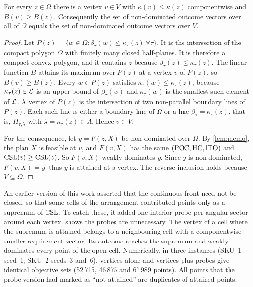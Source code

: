 \begin{theorem}\label{thm:vertex}
  For every $z\in\Omega$ there is a vertex $v\in V$ with $\kappa(v)\le\kappa(z)$
  componentwise and $B(v)\ge B(z)$. Consequently the set of non-dominated outcome vectors
  over all of $\Omega$ equals the set of non-dominated outcome vectors over $V$.
\end{theorem}

\begin{proof}
  Let $P(z)=\{w\in\Omega : \beta_\tau(w)\le\kappa_\tau(z)\ \forall\tau\}$. It is the
  intersection of the compact polygon $\Omega$ with finitely many closed half-planes. It
  is therefore a compact convex polygon, and it contains $z$ because
  $\beta_\tau(z)\le\kappa_\tau(z)$. The linear function $B$ attains its maximum over
  $P(z)$ at a vertex $v$ of $P(z)$, so $B(v)\ge B(z)$. Every $w\in P(z)$ satisfies
  $\kappa_\tau(w)\le\kappa_\tau(z)$, because $\kappa_\tau(z)\in\mathcal{L}$ is an upper bound of
  $\beta_\tau(w)$ and $\kappa_\tau(w)$ is the smallest such element of $\mathcal{L}$. A vertex of
  $P(z)$ is the intersection of two non-parallel boundary lines of $P(z)$. Each such line
  is either a boundary line of $\Omega$ or a line $\beta_\tau=\kappa_\tau(z)$, that is,
  $H_{\tau,\lambda}$ with $\lambda=\kappa_\tau(z)\in\Lambda$. Hence $v\in V$.

  For the consequence, let $y=F(z,X)$ be non-dominated over $\Omega$. By
  \cref{lem:memo}, the plan $X$ is feasible at $v$, and $F(v,X)$ has the same
  $(\mathrm{POC},\mathrm{HC},\mathrm{ITO})$ and $\mathrm{CSL}(v)\ge\mathrm{CSL}(z)$. So $F(v,X)$ weakly dominates $y$. Since $y$
  is non-dominated, $F(v,X)=y$; thus $y$ is attained at a vertex. The reverse inclusion
  holds because $V\subseteq\Omega$.
\end{proof}

\begin{remark}
  An earlier version of this work asserted that the continuous front need not be closed,
  so that some cells of the arrangement contributed points only as a supremum of
  $\mathrm{CSL}$. To catch these, it added one interior probe per angular sector around each
  vertex.  shows the probes are unnecessary. The vertex of a cell where
  the supremum is attained belongs to a neighbouring cell with a componentwise smaller
  requirement vector. Its outcome reaches the supremum and weakly dominates every point of
  the open cell. Numerically, in three instances (SKU~1 seed~1; SKU~2 seeds~3 and~6),
  vertices alone and vertices plus probes give identical objective sets (52\,715,
  46\,875 and 67\,989 points). All points that the probe version had marked as
  ``not attained'' are duplicates of attained points.
\end{remark}

